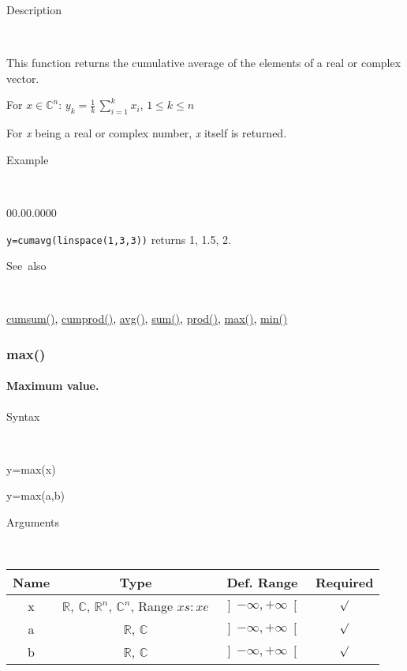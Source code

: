 \begin{description}
\item [Description]~
\end{description}
This function returns the cumulative average of the elements of a
real or complex vector.

\medskip{}
For $x\in$$\mathbb{C}^{n}$: $y_{k}=$${\displaystyle \frac{1}{k}}\,$$\sum\limits _{i=1}^{k}x_{i}$,
$1\leq k\leq n$
\medskip{}

For \textit{x} being a real or complex number, \textit{x} itself is
returned.

\begin{description}
\item [Example]~
\end{description}
\begin{lyxlist}{00.00.0000}
\item [\texttt{y=cumavg(linspace(1,3,3))}]returns 1, 1.5, 2.
\end{lyxlist}
\begin{description}
\item [See~also]~
\end{description}
\textcolor{blue}{\hyperlink{cumsum}{cumsum()}}\textcolor{black}{,}
\textcolor{blue}{\hyperlink{cumprod}{cumprod()}}\textcolor{black}{,}
\textcolor{blue}{\hyperlink{avg}{avg()}}\textcolor{black}{,} \textcolor{blue}{\hyperlink{sum}{sum()}}\textcolor{black}{,}
\textcolor{blue}{\hyperlink{prod}{prod()}}\textcolor{black}{,} \textcolor{blue}{\hyperlink{max}{max()}}\textcolor{black}{,}
\textcolor{blue}{\hyperlink{min}{min()}}


\newpage
\subsubsection*{\hypertarget{max}{}{\Large max()}}

\paragraph{\label{par:Maximum}Maximum value.}

\begin{description}
\item [Syntax]~
\end{description}
y=max(x)

\begin{flushleft}y=max(a,b)\end{flushleft}

\begin{description}
\item [Arguments]~
\end{description}
\begin{tabular}{|c|c|c|c|}
\hline 
Name&
Type&
Def. Range&
Required\tabularnewline
\hline
\hline 
x&
$\mathbb{R}$, $\mathbb{C}$, $\mathbb{R}^{n}$, $\mathbb{C}^{n}$,
Range $xs:xe$&
$\left]-\infty,+\infty\right[$&
$\surd$\tabularnewline
\hline
\hline 
a&
$\mathbb{R}$, $\mathbb{C}$&
$\left]-\infty,+\infty\right[$&
$\surd$\tabularnewline
\hline 
b&
$\mathbb{R}$, $\mathbb{C}$&
$\left]-\infty,+\infty\right[$&
$\surd$\tabularnewline
\hline
\end{tabular}

